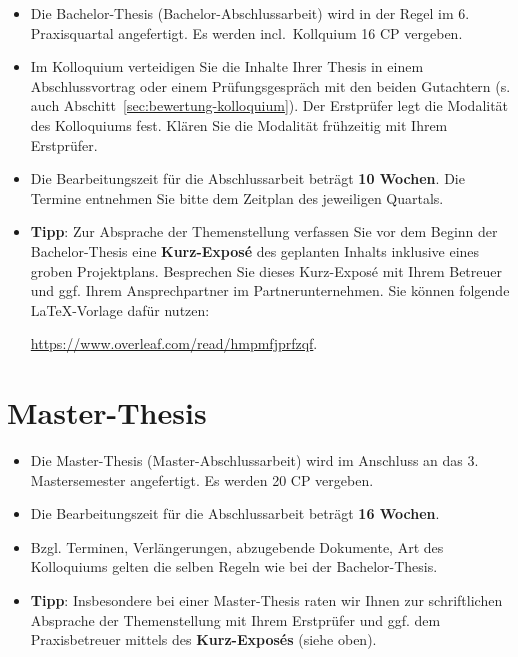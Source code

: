 \begin{itemize}
    \item Die Bachelor-Thesis (Bachelor-Abschlussarbeit) wird in der Regel im 6. Praxisquartal angefertigt. Es werden incl.\ Kollquium 16 CP vergeben.
    
    \item Im Kolloquium verteidigen Sie die Inhalte Ihrer Thesis in einem Abschlussvortrag oder einem Prüfungsgespräch mit den beiden Gutachtern (s. auch Abschitt~\ref{sec:bewertung-kolloquium}). Der Erstprüfer legt die Modalität des Kolloquiums fest. Klären Sie die Modalität frühzeitig mit Ihrem Erstprüfer. 
    
    \item Die Bearbeitungszeit für die Abschlussarbeit beträgt \textbf{10 Wochen}. Die Termine entnehmen Sie bitte dem Zeitplan des jeweiligen Quartals. 
    
    \item \textbf{Tipp}: Zur Absprache der Themenstellung verfassen Sie vor dem Beginn der Bachelor-Thesis eine \textbf{Kurz-Exposé} des geplanten Inhalts inklusive eines groben Projektplans. Besprechen Sie dieses Kurz-Exposé mit Ihrem Betreuer und ggf. Ihrem Ansprechpartner im Partnerunternehmen. Sie können folgende \LaTeX{}-Vorlage dafür nutzen:
    
    \begin{center}
    \url{https://www.overleaf.com/read/hmpmfjprfzqf}.
    \end{center}

\end{itemize}


\section{Master-Thesis}

\begin{itemize}
    \item Die Master-Thesis (Master-Abschlussarbeit) wird im Anschluss an das 3. Mastersemester angefertigt. Es werden 20 CP vergeben. 
    \item Die Bearbeitungszeit für die Abschlussarbeit beträgt \textbf{16 Wochen}.
    \item Bzgl. Terminen, Verlängerungen, abzugebende Dokumente, Art des Kolloquiums gelten die selben Regeln wie bei der Bachelor-Thesis.
    \item \textbf{Tipp}: Insbesondere bei einer Master-Thesis raten wir Ihnen zur schriftlichen Absprache der Themenstellung mit Ihrem Erstprüfer und ggf. dem Praxisbetreuer mittels des \textbf{Kurz-Exposés} (siehe oben).
\end{itemize}

